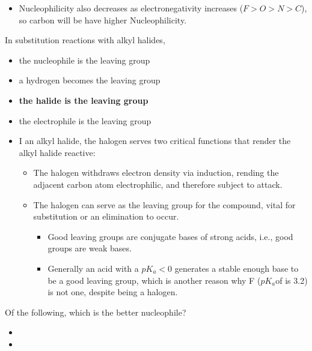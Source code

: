 \documentclass[12pt,a4paper]{article}
\begin{document}
\begin{enumerate}
\begin{itemize}
\begin{itemize}
\begin{itemize}
                    \item Nucleophilicity also decreases as electronegativity increases (\(F>O>N>C\)), so carbon will be have higher Nucleophilicity.
                \end{itemize}
        \end{itemize}
    \end{itemize}
    {\color{G-Moon}\item In substitution reactions with alkyl halides,
    \begin{itemize}
        \item the nucleophile is the leaving group
        \item a hydrogen becomes the leaving group
        \item {\color{o-Sun}\textbf{the halide is the leaving group}}
        \item the electrophile is the leaving group
    \end{itemize}
    }
    \begin{itemize}
        \item I an alkyl halide, the halogen serves two critical functions that render the alkyl halide reactive:
        \begin{itemize}
            \item The halogen withdraws electron density via {\color{o-Sun}induction}, rending the adjacent carbon atom electrophilic, and therefore subject to attack.
            \item The halogen can serve as the {\color{o-Sun}leaving group} for the compound, vital for substitution or an elimination to occur.
            \begin{itemize}
                \item Good leaving groups are conjugate bases of strong acids, i.e., good groups are weak bases.
                \item Generally an acid with a \(pK_a < 0\) generates a stable enough base to be a good leaving group, which is another reason why F (\(pK_a\)of  is 3.2) is not one, despite being a halogen.
            \end{itemize}
        \end{itemize}
    \end{itemize}
    {\color{G-Moon}\item Of the following, which is the better nucleophile?
    \begin{itemize}
        \item {}
        \item {}

\end{itemize}}
\end{enumerate}
\end{document}
